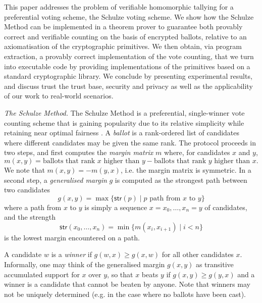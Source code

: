 \documentclass{llncs}
\newcommand{\str}{\mathsf{str}}
\begin{document}
This paper addresses the problem of verifiable homomorphic tallying
for a preferential voting scheme, the Schulze voting scheme. We show
how the Schulze Method can be implemented in a theorem prover to
guarantee both provably correct and verifiable counting on the basis
of encrypted ballots, relative to an axiomatisation of the
cryptographic primitives. We then obtain, via program extraction, a
provably correct implementation of the vote counting, that we turn
into executable code by providing implementations of the primitives
based on a standard cryptographic library. We conclude by presenting
experimental results, and discuss trust the trust base, security and
privacy as well as the applicability of our work to real-world
scenarios. 

  \smallskip\noindent\emph{The Schulze Method.} The Schulze Method
  \cite{Schulze:2011:NMC} is a preferential, single-winner vote
  counting scheme that is gaining popularity due to its relative
  simplicity while retaining near optimal fairness
  \cite{Rivest:2010:OSW}.  
  A \emph{ballot} is a rank-ordered list of
  candidates where different candidates may be given the same rank.
  The protocol proceeds in two steps, and first computes the
  \emph{margin matrix} $m$ where, for candidates $x$ and $y$, 
  \[ m(x, y) = \mbox{ballots that rank $x$ higher than $y$} - \mbox{ballots
  that rank $y$ higher than $x$}. \]
  We note that $m(x, y) = -m(y, x)$, i.e. the margin matrix is
  symmetric. In a second step, a \emph{generalised margin} $g$ is
  computed as the strongest path between two candidates
  \[ g(x,y) = \max \lbrace \str(p) \mid p \mbox{ path from $x$ to
  $y$} \rbrace \]
  where a path from $x$ to $y$ is simply a sequence $x = x_0, \dots,
  x_n = y$ of candidates, and the strength
  \[ \str(x_0, \dots, x_n) = \min \lbrace m(x_i, x_{i+1}) \mid i < n
  \rbrace  \]
  is the lowest margin encountered on a path.

  A candidate $w$ is a \emph{winner} if $g(w, x) \geq g(x, w)$ for
  all other candidates $x$. Informally, one may think of the
  generalised margin $g(x, y)$ as transitive accumulated support for
  $x$ over $y$, so that $x$ beats $y$ if $g(x,y) \geq g(y, x)$ and a
  winner is a candidate that cannot be beaten by anyone. Note that
  winners may not be uniquely determined (e.g. in the case where no
  ballots have been cast).
\end{document}
